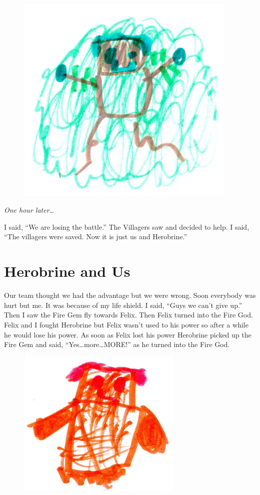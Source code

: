 \documentclass[12pt,oneside]{krantz}
\begin{document}
\begin{figure}
\centering
\includegraphics[width=4.16667in]{img/13-forcefield.jpg}
\caption{}
\end{figure}

\emph{One hour later\ldots{}}

I said, ``We are losing the battle.'' The Villagers saw and decided to
help. I said, ``The villagers were saved. Now it is just us and
Herobrine.''

\chapter{Herobrine and Us}\label{herobrine-and-us}

Our team thought we had the advantage but we were wrong. Soon everybody
was hurt but me. It was because of my life shield. I said, ``Guys we
can't give up.'' Then I saw the Fire Gem fly towards Felix. Then Felix
turned into the Fire God. Felix and I fought Herobrine but Felix wasn't
used to his power so after a while he would lose his power. As soon as
Felix lost his power Herobrine picked up the Fire Gem and said,
``Yes\ldots{}more\ldots{}MORE!'' as he turned into the Fire God.

\begin{figure}
\centering
\includegraphics[width=3.12500in]{img/15-orangeguy.jpg}
\caption{}
\end{figure}
\end{document}

